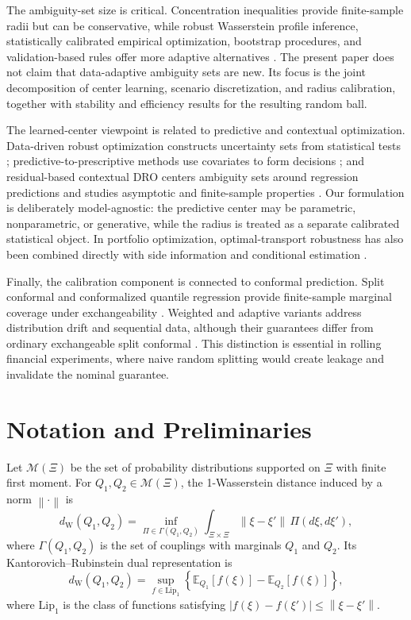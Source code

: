\documentclass[11pt]{article}
\newcommand{\E}{\mathbb{E}}
\newcommand{\cM}{\mathcal{M}}
\newcommand{\XiSet}{\Xi}
\newcommand{\1}{\mathbf{1}}
\newcommand{\dW}{d_{\mathrm W}}
\newcommand{\norm}[1]{\left\lVert #1\right\rVert}
\begin{document}
The ambiguity-set size is critical. Concentration inequalities provide finite-sample radii but can be conservative, while robust Wasserstein profile inference, statistically calibrated empirical optimization, bootstrap procedures, and validation-based rules offer more adaptive alternatives \citep{blanchet2019robust,gotoh2021calibration,bertsimas2022bootstrap}. The present paper does not claim that data-adaptive ambiguity sets are new. Its focus is the joint decomposition of center learning, scenario discretization, and radius calibration, together with stability and efficiency results for the resulting random ball.

The learned-center viewpoint is related to predictive and contextual optimization. Data-driven robust optimization constructs uncertainty sets from statistical tests \citep{bertsimas2018datadriven}; predictive-to-prescriptive methods use covariates to form decisions \citep{bertsimas2020predictive}; and residual-based contextual DRO centers ambiguity sets around regression predictions and studies asymptotic and finite-sample properties \citep{kannan2024residuals}. Our formulation is deliberately model-agnostic: the predictive center may be parametric, nonparametric, or generative, while the radius is treated as a separate calibrated statistical object. In portfolio optimization, optimal-transport robustness has also been combined directly with side information and conditional estimation \citep{nguyen2024robustifying}.

Finally, the calibration component is connected to conformal prediction. Split conformal and conformalized quantile regression provide finite-sample marginal coverage under exchangeability \citep{romano2019conformalized}. Weighted and adaptive variants address distribution drift and sequential data, although their guarantees differ from ordinary exchangeable split conformal \citep{barber2023conformal,gibbs2021adaptive}. This distinction is essential in rolling financial experiments, where naive random splitting would create leakage and invalidate the nominal guarantee.

\section{Notation and Preliminaries}

Let $\cM(\XiSet)$ be the set of probability distributions supported on $\XiSet$ with finite first moment. For $Q_1,Q_2\in\cM(\XiSet)$, the 1-Wasserstein distance induced by a norm $\norm{\cdot}$ is
\begin{equation}\label{eq:wasserstein-primal}
    \dW(Q_1,Q_2)=\inf_{\Pi\in\Gamma(Q_1,Q_2)}\int_{\XiSet\times\XiSet}\norm{\xi-\xi'}\,\Pi(d\xi,d\xi'),
\end{equation}
where $\Gamma(Q_1,Q_2)$ is the set of couplings with marginals $Q_1$ and $Q_2$. Its Kantorovich--Rubinstein dual representation \citep{kantorovich1958space,villani2009optimal} is
\begin{equation}\label{eq:KR}
    \dW(Q_1,Q_2)=\sup_{f\in\mathrm{Lip}_1}\left\{\E_{Q_1}[f(\xi)]-\E_{Q_2}[f(\xi)]\right\},
\end{equation}
where $\mathrm{Lip}_1$ is the class of functions satisfying $|f(\xi)-f(\xi')|\le\norm{\xi-\xi'}$.
\end{document}
